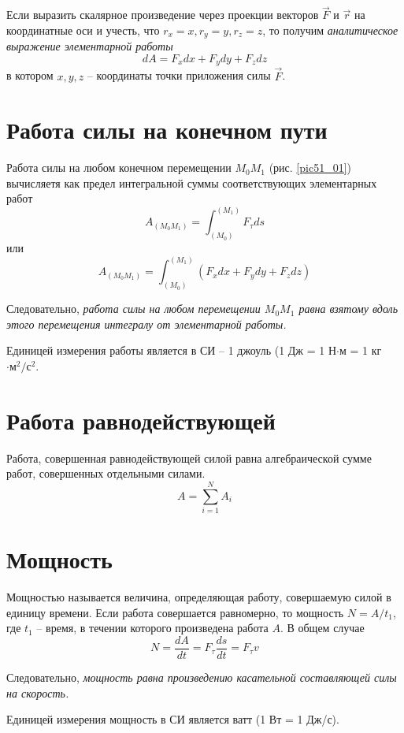 Если выразить скалярное произведение через проекции векторов \( \vec{F} \) 
и \( \vec{r} \) на координатные оси и учесть, что 
\( r_x = x, r_y = y, r_z = z \), то получим \emph{аналитическое выражение 
элементарной работы}
\[ dA = F_x dx + F_y dy + F_z dz \]
в котором \( x, y, z \) -- координаты точки приложения силы \( \vec{F} \).

\section{Работа силы на конечном пути}
Работа силы на любом конечном перемещении \( M_0 M_1 \) (рис. \ref{pic51_01}) 
вычисляетя как предел интегральной суммы соответствующих элементарных 
работ 
\[ A_{(M_0 M_1)} = \int_{(M_0)}^{(M_1)} F_\tau ds \]
или 
\[ 
    A_{(M_0 M_1)} = \int_{(M_0)}^{(M_1)} 
    \left( F_x dx + F_y dy + F_z dz \right)
\]

Следовательно, \emph{работа силы на любом перемещении \( M_0 M_1 \) равна 
взятому вдоль этого перемещения интегралу от элементарной работы.}

Единицей измерения работы является в СИ -- 1 джоуль 
(1 Дж = 1 Н\( \cdot \)м = 1 кг \( \cdot\text{м}^2/\text{с}^2 \).

\section{Работа равнодействующей}
Работа, совершенная равнодействующей силой равна алгебраической сумме 
работ, совершенных отдельными силами.
\[ A = \sum_{i=1}^{N} A_i \]

\section{Мощность}
Мощностью называется величина, определяющая работу, совершаемую силой 
в единицу времени. Если работа совершается равномерно, то мощность 
\( N = A/t_1 \), где \( t_1 \) -- время, в течении которого произведена 
работа \( A \). В общем случае
\[ N = \frac{dA}{dt} = F_\tau \frac{ds}{dt} = F_\tau v \]

Следовательно, \emph{мощность равна произведению касательной 
составляющей силы на скорость.}

Единицей измерения мощность в СИ является ватт (1 Вт = 1 Дж/с).

\newpage
